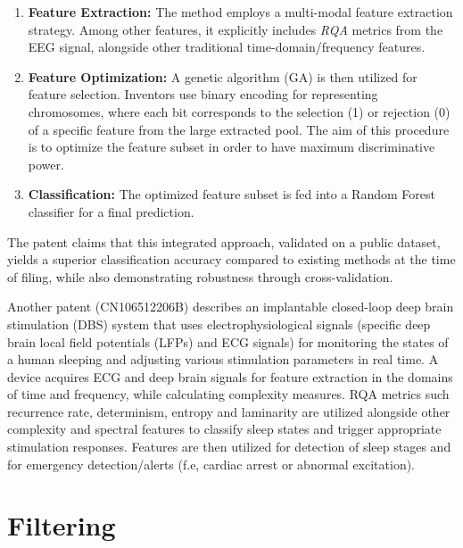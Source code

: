 \documentclass{article}
\begin{document}
				\begin{enumerate}
				    \item \textbf{Feature Extraction:} The method employs a multi-modal feature extraction strategy. 
					    Among other features, it explicitly includes \textit{RQA} metrics from the EEG signal, 
					    alongside other traditional time-domain/frequency features.
				    \item \textbf{Feature Optimization:} A genetic algorithm (GA) is then utilized for feature selection. 
					    Inventors use binary encoding for representing chromosomes, where each bit corresponds to the selection (1) or rejection (0) of a specific 
					    feature from the large extracted pool. The aim of this procedure is to optimize the feature subset in order
					    to have maximum discriminative power.
				    \item \textbf{Classification:} The optimized feature subset is fed into a Random Forest 
					    classifier for a final prediction. 
				\end{enumerate}

			The patent claims that this integrated approach, 
			validated on a public dataset, yields a superior classification 
			accuracy compared to existing methods at the time of filing, 
			while also demonstrating robustness through cross-validation.
		
		Another patent\cite{pat2019} (CN106512206B) describes an 
		implantable closed-loop deep brain stimulation (DBS) system that uses 
		electrophysiological signals (specific deep brain local field potentials (LFPs) and ECG  signals) for monitoring 
		the states of a human sleeping and adjusting various stimulation parameters in real time.
		A device acquires ECG and deep brain signals for feature extraction 
		in the domains of time and frequency, while 
		calculating complexity measures. 
		RQA metrics such recurrence rate, determinism, entropy and laminarity 
		are utilized alongside other complexity 
		and spectral features to classify sleep states and trigger appropriate stimulation responses.
		Features are then utilized for detection of sleep stages 
		and for emergency detection/alerts (f.e, cardiac arrest or abnormal excitation).


		\newpage
		\section{Filtering}
\end{document}
